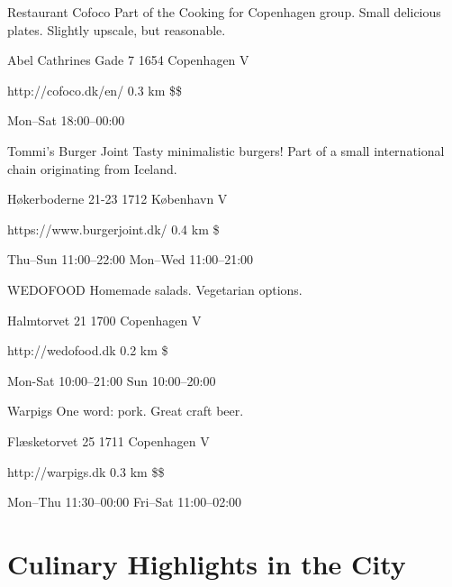 \begin{fooditem}
{Restaurant Cofoco}
{Part of the Cooking for Copenhagen group. Small delicious plates. Slightly upscale, but reasonable.}
{\begin{addr}
{Abel Cathrines Gade 7}
{1654 Copenhagen V}
\end{addr}}
{http://cofoco.dk/en/}
{0.3 km}
{\$\$}
{\begin{ohours}
{Mon–Sat}
{18:00–00:00}
{}
{}
{}
{}
{}
{}
\end{ohours}}
\end{fooditem}
\begin{fooditem}
{Tommi’s Burger Joint}
{Tasty minimalistic burgers! Part of a small international chain originating from Iceland.}
{\begin{addr}
{Høkerboderne 21-23}
{1712 København V}
\end{addr}}
{https://www.burgerjoint.dk/}
{0.4 km}
{\$}
{\begin{ohours}
{Thu–Sun}
{11:00–22:00}
{Mon–Wed}
{11:00–21:00}
{}
{}
{}
{}
\end{ohours}}
\end{fooditem}
\begin{fooditem}
{WEDOFOOD}
{Homemade salads. Vegetarian options.}
{\begin{addr}
{Halmtorvet 21}
{1700 Copenhagen V}
\end{addr}}
{http://wedofood.dk}
{0.2 km}
{\$}
{\begin{ohours}
{Mon-Sat}
{10:00–21:00}
{Sun}
{10:00–20:00}
{}
{}
{}
{}
\end{ohours}}
\end{fooditem}
\begin{fooditem}
{Warpigs}
{One word: pork. Great craft beer.}
{\begin{addr}
{Flæsketorvet 25}
{1711 Copenhagen V}
\end{addr}}
{http://warpigs.dk}
{0.3 km}
{\$\$}
{\begin{ohours}
{Mon–Thu}
{11:30–00:00}
{Fri–Sat}
{11:00–02:00}
{}
{}
{}
{}
\end{ohours}}
\end{fooditem}






\section{Culinary Highlights in the City}

